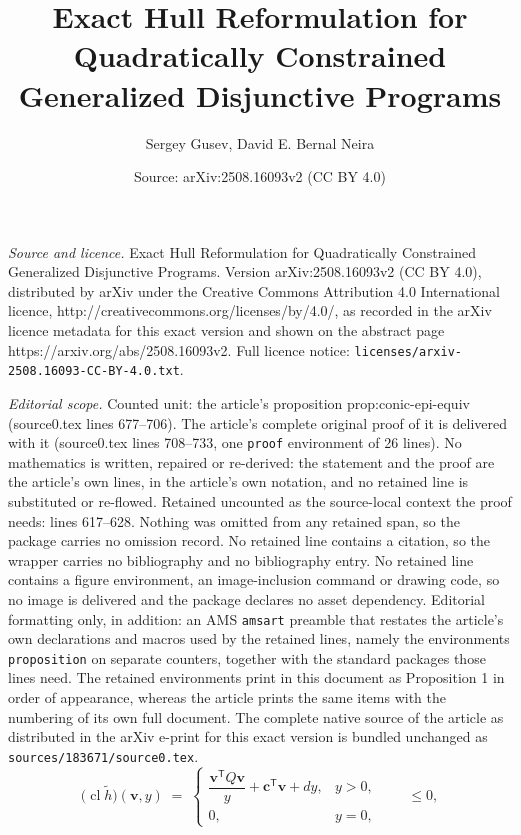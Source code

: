 \documentclass[10pt,a4paper]{amsart}
\title{Exact Hull Reformulation for Quadratically Constrained Generalized Disjunctive Programs}
\author{Sergey Gusev, David E. Bernal Neira}
\date{Source: arXiv:2508.16093v2 (CC BY 4.0)}
\begin{document}
\maketitle

\noindent\emph{Source and licence.} Exact Hull Reformulation for Quadratically Constrained Generalized Disjunctive Programs. Version arXiv:2508.16093v2 (CC BY 4.0), distributed by arXiv under the Creative Commons Attribution 4.0 International licence, http://creativecommons.org/licenses/by/4.0/, as recorded in the arXiv licence metadata for this exact version and shown on the abstract page https://arxiv.org/abs/2508.16093v2. Full licence notice: \texttt{licenses/arxiv-2508.16093-CC-BY-4.0.txt}.\par\smallskip

\noindent\textit{Editorial scope.} Counted unit: the article's proposition prop:conic-epi-equiv (source0.tex lines 677--706). The article's complete original proof of it is delivered with it (source0.tex lines 708--733, one \texttt{proof} environment of 26 lines). No mathematics is written, repaired or re-derived: the statement and the proof are the article's own lines, in the article's own notation, and no retained line is substituted or re-flowed.  Retained uncounted as the source-local context the proof needs: lines 617--628.  Nothing was omitted from any retained span, so the package carries no omission record.  No retained line contains a citation, so the wrapper carries no bibliography and no bibliography entry.  No retained line contains a figure environment, an image-inclusion command or drawing code, so no image is delivered and the package declares no asset dependency.  Editorial formatting only, in addition: an AMS \texttt{amsart} preamble that restates the article's own declarations and macros used by the retained lines, namely the environments \texttt{proposition} on separate counters, together with the standard packages those lines need.  The retained environments print in this document as Proposition 1 in order of appearance, whereas the article prints the same items with the numbering of its own full document.  The complete native source of the article as distributed in the arXiv e-print for this exact version is bundled unchanged as \texttt{sources/183671/source0.tex}.
\begin{equation}
\label{eq:convex-perspective}
    \bigl(\operatorname{cl}\widetilde h\bigr)(\mathbf v,y)
    \;=\;
    \begin{cases}
        \dfrac{\mathbf v^{\mathsf T}Q\mathbf v}{y}
        +\mathbf c^{\mathsf T}\mathbf v
        +dy, & y>0,\\[6pt]
        0, & y=0,
    \end{cases}
    \qquad \le 0,
\end{equation}
\end{document}
